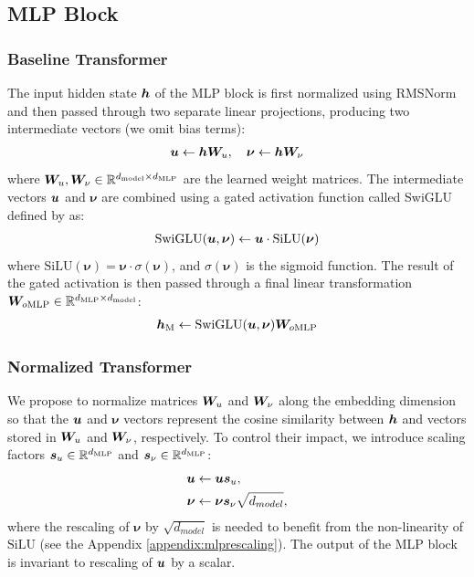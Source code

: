 \documentclass{article} %
\begin{document}
\subsection{MLP Block}

\subsubsection{Baseline Transformer}

The input hidden state ${\bm{h}}$ of the MLP block is first normalized using RMSNorm and then passed through two separate linear projections, producing two intermediate vectors (we omit bias terms):
\begin{align}
    {\bm{u}} \leftarrow {\bm{h}} {\bm{W}}_u, \quad \bm{\nu} \leftarrow {\bm{h}} {\bm{W}}_\nu \label{eq:mlpUV}
\end{align}
where ${\bm{W}}_u, {\bm{W}}_\nu \in \mathbb{R}^{d_{\text{model}} \times d_{\text{MLP}}}$ are the learned weight matrices.  The intermediate vectors ${\bm{u}}$ and $\bm{\nu}$ are combined using a gated activation function called SwiGLU defined by \citet{shazeer2020glu} as:
\begin{align}
    \text{SwiGLU}({\bm{u}}, \bm{\nu}) \leftarrow {\bm{u}} \cdot \text{SiLU}(\bm{\nu}) \label{eq:mlpGating}
\end{align}
where $\text{SiLU}(\bm{\nu}) = \bm{\nu} \cdot \sigma(\bm{\nu})$, and $\sigma(\bm{\nu})$ is the sigmoid function. The result of the gated activation is then passed through a final linear transformation ${\bm{W}}_{o\text{MLP}}  \in \mathbb{R}^{d_{\text{MLP}} \times d_{\text{model}}} $:
\begin{align}
    {\bm{h}}_{\text{M}} \leftarrow \text{SwiGLU}({\bm{u}}, \bm{\nu}) {\bm{W}}_{o\text{MLP}} \label{eq:mlpO}
\end{align}

\subsubsection{Normalized Transformer}

We propose to normalize matrices ${\bm{W}}_u$ and ${\bm{W}}_\nu$ along the embedding dimension so that the ${\bm{u}}$ and $\bm{\nu}$ vectors represent the cosine similarity between ${\bm{h}}$ and vectors stored in ${\bm{W}}_u$ and ${\bm{W}}_\nu$, respectively. 
To control their impact, we introduce scaling factors  ${\bm{s}}_{u}\in\mathbb{R}^{d_{\text{MLP}}}$ and ${\bm{s}}_{\nu}\in\mathbb{R}^{d_{\text{MLP}}}$: 
\begin{align}
    {\bm{u}} &\leftarrow {\bm{u}} {\bm{s}}_{u}, \label{eq:mlpscaling1} \\ 
    \bm{\nu} &\leftarrow \bm{\nu} {\bm{s}}_{\nu} \sqrt{d_{model}}, \label{eq:mlpscaling2}
\end{align}
where the rescaling of $\bm{\nu}$ by $\sqrt{d_{model}}$ is needed to benefit from the non-linearity of $\text{SiLU}$ (see the Appendix \ref{appendix:mlprescaling}). The output of the MLP block is invariant to rescaling of ${\bm{u}}$ by a scalar. %
\end{document}
